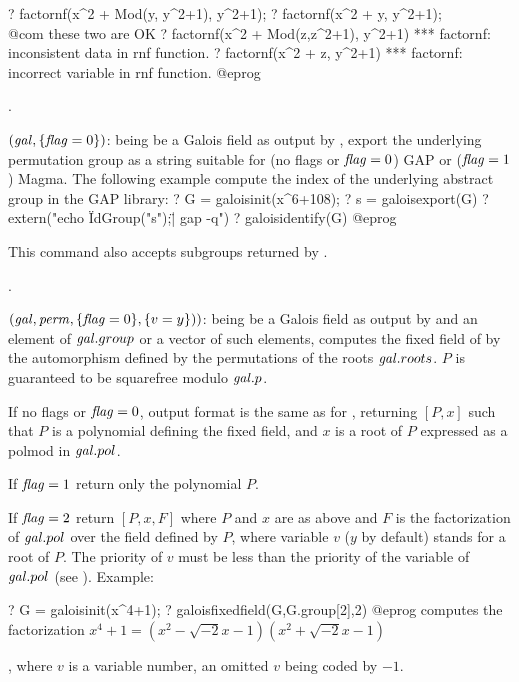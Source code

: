 \bprog
? factornf(x^2 + Mod(y, y^2+1), y^2+1);
? factornf(x^2 + y, y^2+1); \\@com these two are OK
? factornf(x^2 + Mod(z,z^2+1), y^2+1)
  *** factornf: inconsistent data in rnf function.
? factornf(x^2 + z, y^2+1)
  *** factornf: incorrect variable in rnf function.
@eprog

.

$(\hbox{\it gal\/},\{\hbox{\it f\kern0pt lag\/}=0\})$:
 being be a Galois field as output by ,
export the underlying permutation group as a string suitable
for (no flags or $\hbox{\it f\kern0pt lag\/}=0$) GAP or ($\hbox{\it f\kern0pt lag\/}=1$) Magma. The following example
compute the index of the underlying abstract group in the GAP library:
\bprog
? G = galoisinit(x^6+108);
? s = galoisexport(G)
? extern("echo \"IdGroup("s");\" | gap -q")
? galoisidentify(G)
@eprog

This command also accepts subgroups returned by .

.

$(\hbox{\it gal\/},\hbox{\it perm\/},\{\hbox{\it f\kern0pt lag\/}=0\},\{v=y\}))$:
 being be a Galois field as output by  and
 an element of $\hbox{\it gal\/}.group$ or a vector of such elements,
computes the fixed field of  by the automorphism defined by the
permutations  of the roots $\hbox{\it gal\/}.roots$. $P$ is guaranteed to
be squarefree modulo $\hbox{\it gal\/}.p$.

If no flags or $\hbox{\it f\kern0pt lag\/}=0$, output format is the same as for ,
returning $[P,x]$ such that $P$ is a polynomial defining the fixed field, and
$x$ is a root of $P$ expressed as a polmod in $\hbox{\it gal\/}.pol$.

If $\hbox{\it f\kern0pt lag\/}=1$ return only the polynomial $P$.

If $\hbox{\it f\kern0pt lag\/}=2$ return $[P,x,F]$ where $P$ and $x$ are as above and $F$ is the
factorization of $\hbox{\it gal\/}.pol$ over the field defined by $P$, where
variable $v$ ($y$ by default) stands for a root of $P$. The priority of $v$
must be less than the priority of the variable of $\hbox{\it gal\/}.pol$ (see
). Example:

\bprog
? G = galoisinit(x^4+1);
? galoisfixedfield(G,G.group[2],2)
@eprog\noindent
computes the factorization  $x^4+1=(x^2-\sqrt{-2}x-1)(x^2+\sqrt{-2}x-1)$

, where $v$ is a variable number, an omitted $v$ being coded by $-1$.

